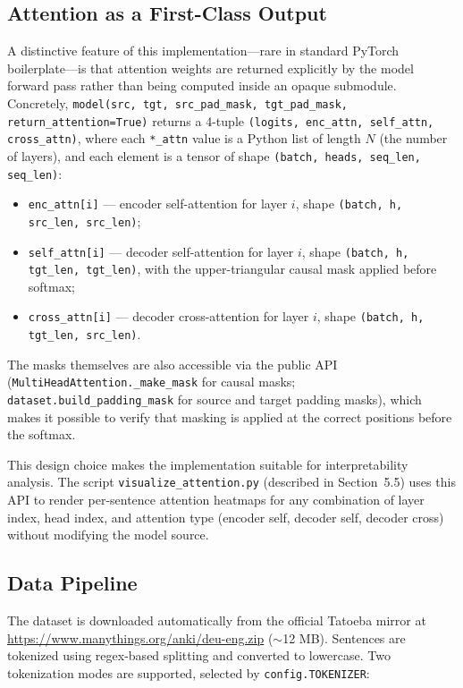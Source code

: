 \subsection{Attention as a First-Class Output}

A distinctive feature of this implementation---rare in standard PyTorch boilerplate---is that attention weights are returned explicitly by the model forward pass rather than being computed inside an opaque submodule. Concretely, \texttt{model(src, tgt, src\_pad\_mask, tgt\_pad\_mask, return\_attention=True)} returns a 4-tuple \texttt{(logits, enc\_attn, self\_attn, cross\_attn)}, where each \texttt{*\_attn} value is a Python list of length $N$ (the number of layers), and each element is a tensor of shape \texttt{(batch, heads, seq\_len, seq\_len)}:

\begin{itemize}
\item \texttt{enc\_attn[i]} --- encoder self-attention for layer $i$, shape \texttt{(batch, h, src\_len, src\_len)};
\item \texttt{self\_attn[i]} --- decoder self-attention for layer $i$, shape \texttt{(batch, h, tgt\_len, tgt\_len)}, with the upper-triangular causal mask applied before softmax;
\item \texttt{cross\_attn[i]} --- decoder cross-attention for layer $i$, shape \texttt{(batch, h, tgt\_len, src\_len)}.
\end{itemize}

The masks themselves are also accessible via the public API (\texttt{MultiHeadAttention.\_make\_mask} for causal masks; \texttt{dataset.build\_padding\_mask} for source and target padding masks), which makes it possible to verify that masking is applied at the correct positions before the softmax.

This design choice makes the implementation suitable for interpretability analysis. The script \texttt{visualize\_attention.py} (described in Section~5.5) uses this API to render per-sentence attention heatmaps for any combination of layer index, head index, and attention type (encoder self, decoder self, decoder cross) without modifying the model source.

\subsection{Data Pipeline}

The dataset is downloaded automatically from the official Tatoeba mirror at \url{https://www.manythings.org/anki/deu-eng.zip} ($\sim$12 MB). Sentences are tokenized using regex-based splitting and converted to lowercase. Two tokenization modes are supported, selected by \texttt{config.TOKENIZER}:

